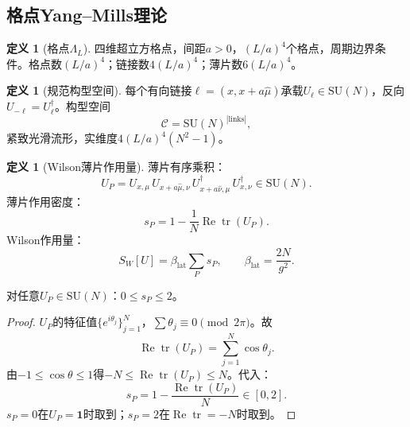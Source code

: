 \documentclass[12pt,a4paper]{article}
\theoremstyle{plain}
\theoremstyle{definition}\newtheorem{definition}[theorem]{定义}
\theoremstyle{remark}\newtheorem{remark}[theorem]{注记}
\begin{document}
\subsection{格点Yang--Mills理论}\label{sec:lattice}

\begin{definition}[格点$\Lambda_L$]\label{def:lattice}
四维超立方格点，间距$a>0$，$(L/a)^4$个格点，周期边界条件。格点数$(L/a)^4$；链接数$4(L/a)^4$；薄片数$6(L/a)^4$。
\end{definition}

\begin{definition}[规范构型空间]\label{def:config}
每个有向链接$\ell=(x,x+a\hat\mu)$承载$U_\ell\in\mathrm{SU}(N)$，反向$U_{-\ell}=U_\ell^\dagger$。构型空间
\begin{equation}\label{eq:config}
\mathcal{C} = \mathrm{SU}(N)^{|\mathrm{links}|},
\end{equation}
紧致光滑流形，实维度$4(L/a)^4(N^2-1)$。
\end{definition}

\begin{definition}[Wilson薄片作用量]\label{def:wilson}
薄片有序乘积：
\begin{equation}\label{eq:UP}
U_P = U_{x,\mu}\,U_{x+a\hat\mu,\nu}\,U_{x+a\hat\nu,\mu}^\dagger\,U_{x,\nu}^\dagger \in \mathrm{SU}(N).
\end{equation}
薄片作用密度：
\begin{equation}\label{eq:sp}
s_P = 1 - \frac{1}{N}\operatorname{Re}\operatorname{tr}(U_P).
\end{equation}
Wilson作用量：
\begin{equation}\label{eq:SW}
S_W[U] = \beta_{\mathrm{lat}}\sum_P s_P, \qquad \beta_{\mathrm{lat}} = \frac{2N}{g^2}.
\end{equation}
\end{definition}

\begin{lemma}[$s_P$的界]\label{lem:sp}
对任意$U_P\in\mathrm{SU}(N)$：$0\leq s_P\leq 2$。
\end{lemma}

\begin{proof}
$U_P$的特征值$\{e^{i\theta_j}\}_{j=1}^N$，$\sum\theta_j\equiv 0\pmod{2\pi}$。故
\begin{equation}
\operatorname{Re}\operatorname{tr}(U_P) = \sum_{j=1}^N \cos\theta_j.
\end{equation}
由$-1\leq\cos\theta\leq 1$得$-N\leq\operatorname{Re}\operatorname{tr}(U_P)\leq N$。代入：
\begin{equation}
s_P = 1 - \frac{\operatorname{Re}\operatorname{tr}(U_P)}{N} \in [0,2].
\end{equation}
$s_P=0$在$U_P=\mathbf{1}$时取到；$s_P=2$在$\operatorname{Re}\operatorname{tr}=-N$时取到。
\end{proof}
\end{document}

